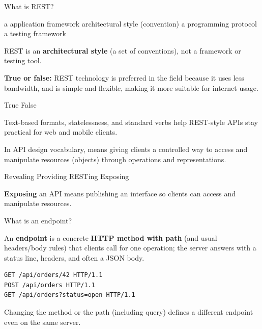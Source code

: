 \question[4]
What is REST?
\begin{choices}
  \choice a application framework
  \CorrectChoice architectural style (convention)
  \choice a programming protocol
  \choice a testing framework
\end{choices}
\begin{solution}
  REST is an \textbf{architectural style} (a set of conventions), not a framework or testing tool.
\end{solution}

\question[4]
\textbf{True or false:} REST technology is preferred in the field because it uses less bandwidth, and is simple and flexible, making it more suitable for internet usage.
\begin{choices}
  \CorrectChoice True
  \choice False
\end{choices}
\begin{solution}
  Text-based formats, statelessness, and standard verbs help REST-style APIs stay practical for web and mobile clients.
\end{solution}

\question[4]
In API design vocabulary, \blank[7em] means giving clients a controlled way to access and manipulate resources (objects) through operations and representations.
\begin{choices}
  \choice Revealing
  \choice Providing
  \choice RESTing
  \CorrectChoice Exposing
\end{choices}
\begin{solution}
  \textbf{Exposing} an API means publishing an interface so clients can access and manipulate resources.
\end{solution}




\question[4]
What is an endpoint?
\makeemptybox{1.00in}
\begin{solution}
  An \textbf{endpoint} is a concrete \textbf{HTTP method with path} (and usual headers/body rules) that clients call for one operation; the server answers with a status line, headers, and often a JSON body.
  \begin{lstlisting}[style=http]
GET /api/orders/42 HTTP/1.1
POST /api/orders HTTP/1.1
GET /api/orders?status=open HTTP/1.1
  \end{lstlisting}
  Changing the method or the path (including query) defines a different endpoint even on the same server.
\end{solution}


